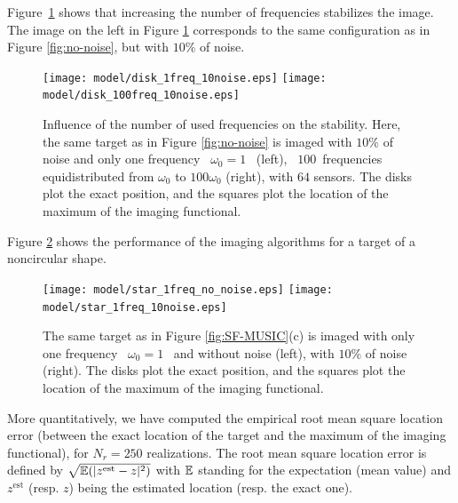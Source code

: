 Figure~\ref{fig:noise-freq_qualitative} shows that increasing the
number of frequencies stabilizes the image. The image on the left
in Figure \ref{fig:noise-freq_qualitative} corresponds to the same
configuration as in Figure \ref{fig:no-noise}, but with $10\%$ of
noise.

\begin{figure}
\centering%
\texttt{[image: model/disk\_1freq\_10noise.eps]} \hspace{0.2cm}
\texttt{[image: model/disk\_100freq\_10noise.eps]}\tabularnewline
\caption{ \label{fig:noise-freq_qualitative}Influence of the
number of used frequencies on the stability. Here, the same target
as in Figure \ref{fig:no-noise} is imaged with $10\%$ of noise and
only one frequency ~$\omega_0=1$~ (left), ~$100$~frequencies
equidistributed from $\omega_0$ to $100 \omega_0$ (right), with
$64$ sensors. The disks plot the exact position, and the squares
plot the location of the maximum of the imaging functional.}
\end{figure}

 Figure \ref{generalshape} shows the performance of the
imaging algorithms for a target of a noncircular shape.
\begin{figure}
\centering%
\texttt{[image: model/star\_1freq\_no\_noise.eps]} \hspace{0.2cm}
\texttt{[image: model/star\_1freq\_10noise.eps]} \hspace{0.2cm}
\tabularnewline
\caption{\label{generalshape} The same target as in Figure
\ref{fig:SF-MUSIC}(c) is imaged with  only one frequency
~$\omega_0=1$~ and without noise (left), with $10\%$ of noise
(right). The disks plot the exact position, and the squares plot
the location of the maximum of the imaging functional.
}
\end{figure}







More quantitatively, we have computed the empirical root mean
square location error (between the exact location of the target
and the maximum of the imaging functional), for $N_{r}=250$
realizations. The root mean square location error is defined by
$\sqrt{\mathbb{E}(|{z}^{\textrm{est}} - z|^2 )}$ with $\mathbb{E}$ standing for the
expectation (mean value) and $z^{\textrm{est}}$ (resp. $z$) being the
estimated location (resp. the exact one).

